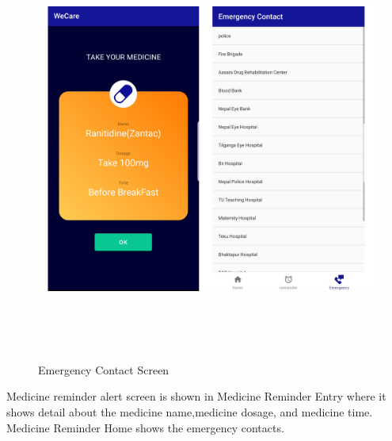 {\begin{figure}[H]
\begin{center}
\includegraphics[width=155mm, height = 140mm]{Outputnew/5.png}
\caption{Emergency Contact Screen}
\end{center}
\end{figure}

Medicine reminder alert screen is shown in Medicine Reminder Entry where it shows detail about the medicine name,medicine dosage, and medicine time. Medicine Reminder Home shows the emergency contacts.


}
